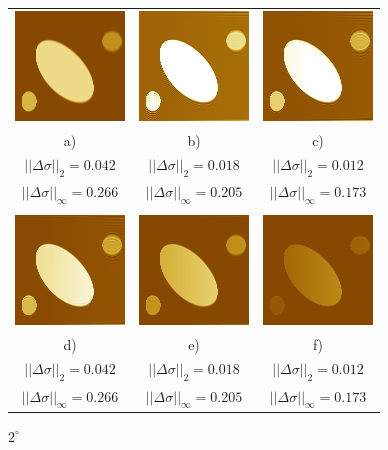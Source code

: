 \documentclass{procDDs}
\begin{document}
\begin{figure}[h!]\center
	\footnotesize
	\begin{tabular}{ccc}
		\includegraphics[width=0.2\linewidth]{img/6/1.jpg}
		&
		\includegraphics[width=0.2\linewidth]{img/6/3.jpg}
		&
		\includegraphics[width=0.2\linewidth]{img/6/4.jpg}

		\\
		a) & b) & c)
		\\
		$||\Delta\sigma||_2 = 0.042$ & 
		$||\Delta\sigma||_2 = 0.018$ &  
		$||\Delta\sigma||_2 = 0.012$  
		\\
		$||\Delta\sigma||_\infty = 0.266$ & 
		$||\Delta\sigma||_\infty = 0.205$ &  
		$||\Delta\sigma||_\infty = 0.173$
		\\ \\
		\includegraphics[width=0.2\linewidth]{img/6/5.jpg}
		&
		\includegraphics[width=0.2\linewidth]{img/6/6.jpg}
		&
		\includegraphics[width=0.2\linewidth]{img/6/9.jpg}
		\\
		d) & e) & f)
		\\
		$||\Delta\sigma||_2 = 0.042$ & 
		$||\Delta\sigma||_2 = 0.018$ &  
		$||\Delta\sigma||_2 = 0.012$  
		\\
		$||\Delta\sigma||_\infty = 0.266$ & 
		$||\Delta\sigma||_\infty = 0.205$ &  
		$||\Delta\sigma||_\infty = 0.173$
	\end{tabular}
	\caption{$2^\circ$}
	\label{ris:desc2}
\end{figure}
\end{document}
